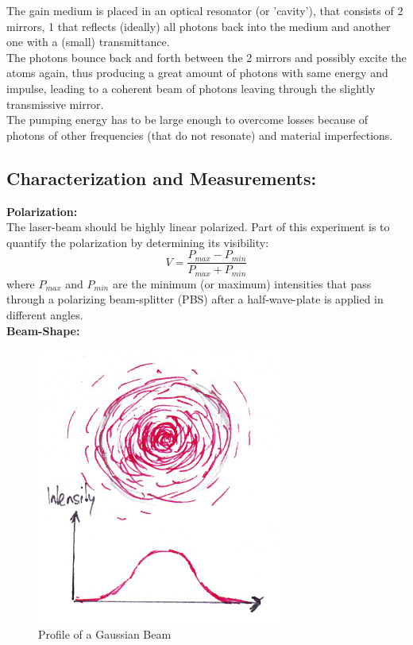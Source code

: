 \documentclass[12pt,a4paper]{article}
\begin{document}
\begin{multicols}{2}
The gain medium is placed in an optical resonator (or 'cavity'), that consists of 2 mirrors, 1 that reflects (ideally) all photons back into the medium and another one with a (small) transmittance.\\
The photons bounce back and forth between the 2 mirrors and possibly excite the atoms again, thus producing a great amount of photons with same energy and impulse, leading to a coherent beam of photons leaving through the slightly transmissive mirror.\\

\noindent The pumping energy has to be large enough to overcome losses because of photons of other frequencies (that do not resonate) and material imperfections.\\

\subsection{Characterization and Measurements:}

\textbf{Polarization:}\\
The laser-beam should be highly linear polarized. Part of this experiment is to quantify the polarization by determining its visibility:
$$V = \frac{P_{max}-P_{min}}{P_{max}+P_{min}}$$
where $P_{max}$ and $P_{min}$ are the minimum (or maximum) intensities that pass through a polarizing beam-splitter (PBS) after a half-wave-plate is applied in different angles.\\

\noindent \textbf{Beam-Shape:}

\begin{figure}[H]
 \centering
 \includegraphics[scale=1.3]{./figures/gaussian_profile.png}
 \caption{Profile of a Gaussian Beam}
 \label{fig:gauss_profile}
\end{figure}



\end{multicols}
\end{document}
